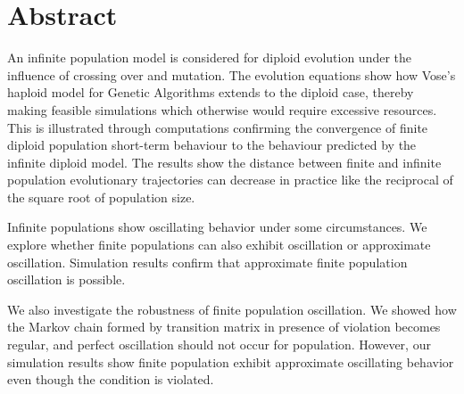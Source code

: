 \chapter*{Abstract}\label{ch:abstract}

An infinite population model is considered for diploid evolution under the influence of crossing over
and mutation. The evolution equations show how Vose's 
haploid model for Genetic Algorithms extends to the diploid case, thereby making feasible simulations
which otherwise would require excessive resources. This is illustrated through computations confirming
the convergence of finite diploid population short-term behaviour to the behaviour predicted by the
infinite diploid model. The results show the distance between finite and infinite population evolutionary trajectories can 
decrease in practice like the reciprocal of the square root of population size. 

Infinite populations show oscillating behavior under 
some circumstances. We explore whether finite populations can also exhibit oscillation or approximate oscillation. 
Simulation results confirm that approximate finite population oscillation is possible. 

We also investigate the robustness of finite population oscillation.  
We showed how the Markov chain 
formed by transition matrix in presence of violation becomes regular, and perfect oscillation should not occur for population. 
However, our simulation results show finite population exhibit approximate oscillating behavior even though the condition is violated.

